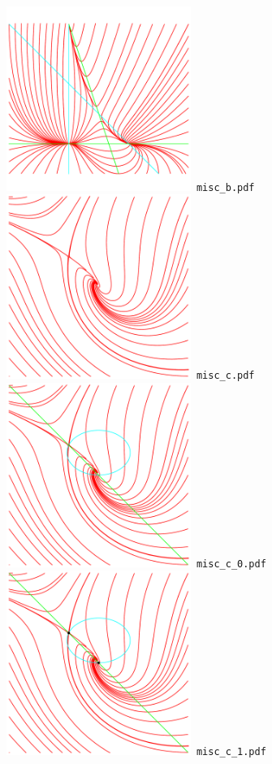 \documentclass[a4paper]{amsart}
\begin{document}
\includegraphics[width=6cm]{misc_b.pdf}\verb+ misc_b.pdf+\\
\includegraphics[width=6cm]{misc_c.pdf}\verb+ misc_c.pdf+\\
\includegraphics[width=6cm]{misc_c_0.pdf}\verb+ misc_c_0.pdf+\\
\includegraphics[width=6cm]{misc_c_1.pdf}\verb+ misc_c_1.pdf+\\
\end{document}
